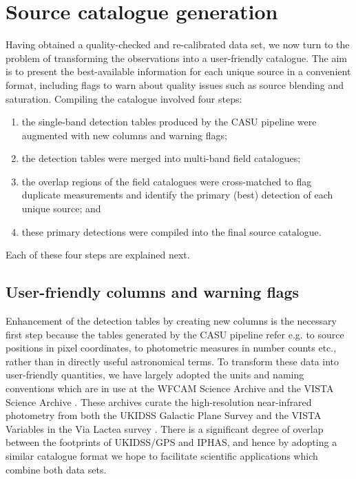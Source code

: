 \documentclass[useAMS,usenatbib]{mn2e}
\begin{document}
\section{Source catalogue generation}
\label{sec:catalogue}

Having obtained a quality-checked 
and re-calibrated data set, 
we now turn to the problem
of transforming the observations 
into a user-friendly catalogue.
The aim is to present
the best-available information for each unique source
in a convenient format,
including flags to warn about quality issues 
such as source blending and saturation.
Compiling the catalogue involved four steps:
\begin{enumerate}
\item the single-band detection tables 
produced by the CASU pipeline 
were augmented with new columns
and warning flags;
\item the detection tables were merged into multi-band field catalogues;
\item the overlap regions of the field catalogues 
were cross-matched to flag duplicate measurements 
and identify the primary (best) detection 
of each unique source; and
\item these primary detections
were compiled into the final source catalogue.
\end{enumerate}
Each of these four steps are explained next.

\subsection{User-friendly columns and warning flags}

Enhancement of the detection tables by creating new columns
is the necessary first step because the tables generated by the CASU pipeline
refer e.g. to source positions in pixel coordinates, to photometric measures 
in number counts etc., rather than in directly useful astronomical terms.
To transform these data into user-friendly quantities,
we have largely adopted the units and naming conventions
which are in use at the 
WFCAM Science Archive \citep[WSA;][]{Hambly2008}
and the VISTA Science Archive \citep[VSA;][]{Cross2012}.
These archives curate the high-resolution near-infrared photometry from both
the UKIDSS Galactic Plane Survey \citep[GPS;][]{Lucas2008}
and the 
VISTA Variables in the Via Lactea survey \cite[VVV;][]{Minniti2010}.
There is a significant degree of overlap
between the footprints of UKIDSS/GPS and IPHAS,
and hence by adopting a similar catalogue format
we hope to facilitate scientific applications
which combine both data sets.
\end{document}
